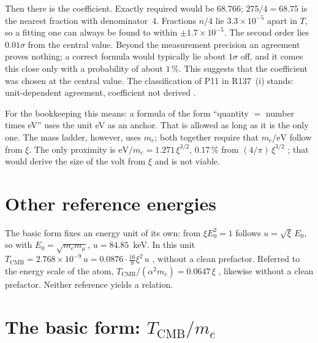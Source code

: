 Then there is the coefficient. Exactly required would be $68.766$; $275/4=68.75$ is the nearest
fraction with denominator~4. Fractions $n/4$ lie $3.3\times10^{-5}$ apart in $T$, so a fitting
one can always be found to within $\pm1.7\times10^{-5}$. The second order lies $0.01\sigma$ from
the central value. Beyond the measurement precision an agreement proves nothing; a correct formula
would typically lie about $1\sigma$ off, and it comes this close only with a probability of about
$1\,\%$. This suggests that the coefficient was chosen at the central value. The classification of P11 in R137~(i) stands: unit-dependent agreement,
coefficient not derived \SM.

For the bookkeeping this means: a formula of the form ``quantity $=$ number times eV'' uses the
unit eV as an anchor. That is allowed as long as it is the only one. The mass ladder, however,
uses $m_e$; both together require that $m_e/\mathrm{eV}$ follow from $\xi$. The only proximity is
$\mathrm{eV}/m_e=1.271\,\xi^{3/2}$, $0.17\,\%$ from $(4/\pi)\,\xi^{3/2}$ \KM; that would derive
the size of the volt from $\xi$ and is not viable.

\section{Other reference energies}

The basic form fixes an energy unit of its own: from $\xi E_0^2=1$ follows $u=\sqrt{\xi}\,E_0$,
so with $E_0=\sqrt{m_em_\mu}$, $u=84.85$~keV. In this unit
$T_{\mathrm{CMB}}=2.768\times10^{-9}\,u=0.0876\cdot\frac{16}{9}\xi^2\,u$ \KM, without a clean
prefactor. Referred to the energy scale of the atom,
$T_{\mathrm{CMB}}/(\alpha^2m_e)=0.0647\,\xi$ \KM, likewise without a clean prefactor. Neither
reference yields a relation.

\section{The basic form: $T_{\mathrm{CMB}}/m_e$}

